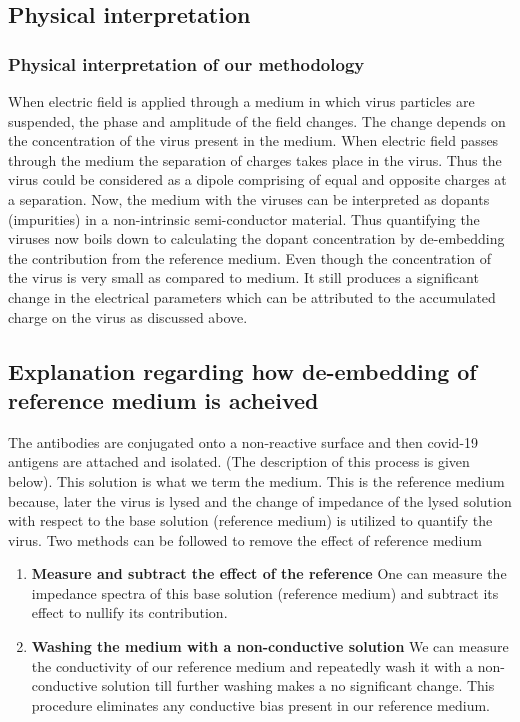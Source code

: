 \documentclass{FR16}
\begin{document}
\subsection{Physical interpretation}

\subsubsection{Physical interpretation of our methodology}
When electric field is applied through a medium in which virus particles are suspended, the phase and amplitude of the field changes. The change depends on the concentration of the virus present in the medium. When electric field passes through the medium the separation of charges takes place in the virus. Thus the virus could be considered as a dipole comprising of equal and opposite charges at a separation. Now, the medium with the viruses can be interpreted as dopants (impurities) in a non-intrinsic semi-conductor material. Thus quantifying the viruses now boils down to calculating the dopant concentration by de-embedding the contribution from the reference medium. Even though the concentration of the virus is very small as compared to medium. It still produces a significant change in the electrical parameters which can be attributed to the accumulated charge on the virus as discussed above.

\subsection{Explanation regarding how de-embedding of reference medium is acheived}
The antibodies are conjugated onto a non-reactive surface and then covid-19 antigens are attached and isolated. (The description of this process is given below). This solution is what we term the medium. This is the reference medium because, later the virus is lysed and the change of impedance of the lysed solution  with respect to the  base solution (reference medium) is utilized to quantify the virus.  Two methods can be followed to remove the effect of reference medium

\begin{enumerate}
    \item \textbf{Measure and subtract the effect of the reference} One can measure the impedance spectra of this base solution (reference medium) and subtract its effect to nullify its contribution.
    
    \item \textbf{Washing the medium with a non-conductive solution} We can measure the conductivity of our reference medium and repeatedly wash it with a non-conductive solution  till further washing makes a no significant change. This procedure eliminates any conductive bias present in our reference medium.
\end{enumerate}
\end{document}
